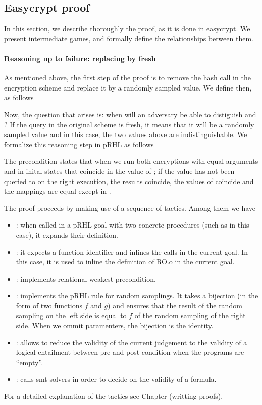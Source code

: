 \subsection{Easycrypt proof}
In this section, we describe thoroughly the proof, as it is done in
easycrypt. We present intermediate games, and formally define the
relationships between them.

\paragraph{Reasoning up to failure: replacing  by fresh }
As mentioned above, the first step of the proof is to remove the hash
call in the encryption scheme and replace it by a randomly sampled
value. We define  then, as follows


Now, the question that arises is: when will an adversary be able to
distiguish  and ? %
If the query in the original scheme is fresh, it means that it will be
a randomly sampled value and in this case, the two values above are
indistinguishable. We formalize this reasoning step in pRHL as follows


The precondition states that when we run both encryptions with equal
arguments  and in inital states that coincide in the value
of ; if the value  has not been queried to
 on the right execution, the results coincide, the values of
 coincide and the mappings  are equal except in
.

The proof proceeds by making use of a sequence of tactics. Among them
we have
\begin{itemize}
\item {}: when called in a pRHL goal with two concrete
  procedures (such as in this case), it expands their definition. 
\item {}: it expects a function identifier and inlines the
  calls in the current goal. In this case, it is used to inline the
  definition of RO.o in the current goal.
\item {}: implements relational weakest precondition.
\item {}: implements the pRHL rule for random samplings. It
  takes a bijection (in the form of two functions $f$ and $g$) and ensures that
  the result of the random sampling on the left side is equal to $f$
  of the random sampling of the right side. When we ommit paramenters,
  the bijection is the identity.
\item {}: allows to reduce the validity of the current
  judgement to the validity of a logical entailment between pre and
  post condition when the programs are ``empty''.
\item {}: calls smt solvers in order to decide on the validity
  of a formula.
\end{itemize} 
For a detailed explanation of the tactics see Chapter (writting proofs).

